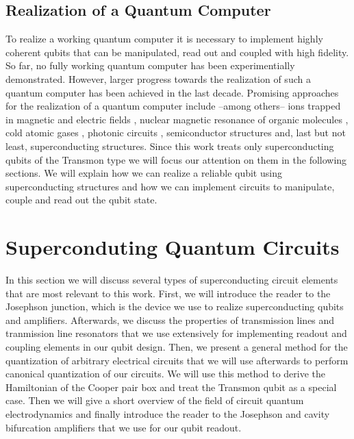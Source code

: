 \subsection{Realization of a Quantum Computer}

To realize a working quantum computer it is necessary to implement highly coherent qubits that can be manipulated, read out and coupled with high fidelity. So far, no fully working quantum computer has been experimentially demonstrated. However, larger progress towards the realization of such a quantum computer has been achieved in the last decade. Promising approaches for the realization of a quantum computer include --among others-- ions trapped in magnetic and electric fields \citep{monroe_demonstration_1995,cirac_quantum_1995}, nuclear magnetic resonance of organic molecules \citep{jones_nmr_2001,vandersypen_experimental_2001}, cold atomic gases \citep{briegel_quantum_2000}, photonic circuits \citep{knill_scheme_2001}, semiconductor structures \citep{loss_quantum_1998} and, last but not least, superconducting structures. Since this work treats only superconducting qubits of the Transmon type we will focus our attention on them in the following sections. We will explain how we can realize a reliable qubit using superconducting structures and how we can implement circuits to manipulate, couple and read out the qubit state.

\section{Superconduting Quantum Circuits}

In this section we will discuss several types of superconducting circuit elements that are most relevant to this work. First, we will introduce the reader to the Josephson junction, which is the device we use to realize superconducting qubits and amplifiers. Afterwards, we discuss the properties of transmission lines and tranmission line resonators that we use extensively for implementing readout and coupling elements in our qubit design. Then, we present a general method for the quantization of arbitrary electrical circuits that we will use afterwards to perform canonical quantization of our circuits. We will use this method to derive the Hamiltonian of the Cooper pair box and treat the Transmon qubit as a special case. Then we will give a short overview of the field of circuit quantum electrodynamics and finally introduce the reader to the Josephson and cavity bifurcation amplifiers that we use for our qubit readout.

